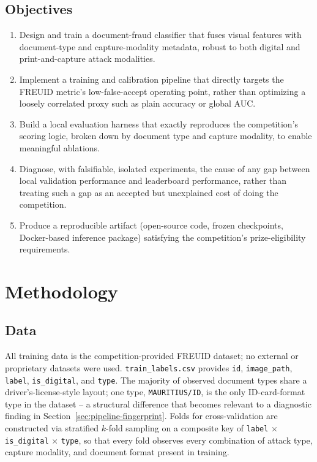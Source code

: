 \documentclass{article}
\begin{document}
\subsection{Objectives}
\begin{enumerate}[noitemsep]
    \item Design and train a document-fraud classifier that fuses visual
    features with document-type and capture-modality metadata, robust to
    both digital and print-and-capture attack modalities.
    \item Implement a training and calibration pipeline that directly
    targets the FREUID metric's low-false-accept operating point, rather
    than optimizing a loosely correlated proxy such as plain accuracy or
    global AUC.
    \item Build a local evaluation harness that exactly reproduces the
    competition's scoring logic, broken down by document type and capture
    modality, to enable meaningful ablations.
    \item Diagnose, with falsifiable, isolated experiments, the cause of any
    gap between local validation performance and leaderboard performance,
    rather than treating such a gap as an accepted but unexplained cost of
    doing the competition.
    \item Produce a reproducible artifact (open-source code, frozen
    checkpoints, Docker-based inference package) satisfying the
    competition's prize-eligibility requirements.
\end{enumerate}

\section{Methodology}
\label{sec:method}

\subsection{Data}

All training data is the competition-provided FREUID dataset; no external
or proprietary datasets were used. \texttt{train\_labels.csv} provides
\texttt{id}, \texttt{image\_path}, \texttt{label}, \texttt{is\_digital}, and
\texttt{type}. The majority of observed document types share a
driver's-license-style layout; one type, \texttt{MAURITIUS/ID}, is the only
ID-card-format type in the dataset -- a structural difference that becomes
relevant to a diagnostic finding in Section~\ref{sec:pipeline-fingerprint}.
Folds for cross-validation are constructed via stratified $k$-fold sampling
on a composite key of \texttt{label} $\times$ \texttt{is\_digital}
$\times$ \texttt{type}, so that every fold observes every combination of
attack type, capture modality, and document format present in training.
\end{document}
